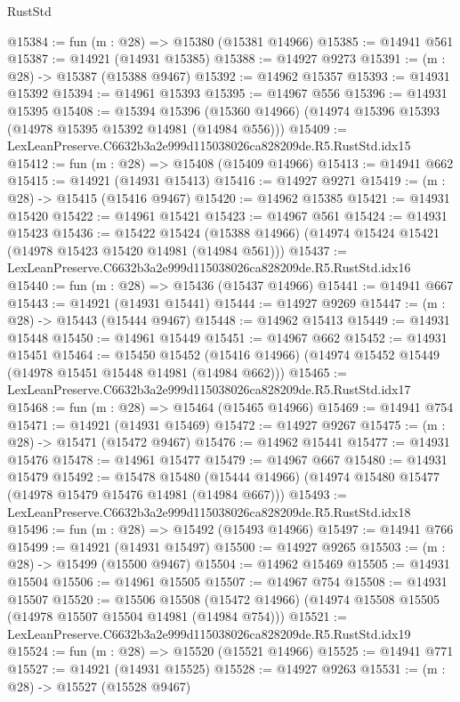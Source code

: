 \begin{lexlean}{RustStd}
\begin{coremodule}
@15384 := fun (m : @28) => @15380 (@15381 @14966)
@15385 := @14941 @561
@15387 := @14921 (@14931 @15385)
@15388 := @14927 @9273
@15391 := (m : @28) -> @15387 (@15388 @9467)
@15392 := @14962 @15357
@15393 := @14931 @15392
@15394 := @14961 @15393
@15395 := @14967 @556
@15396 := @14931 @15395
@15408 := @15394
    @15396
    (@15360 @14966)
    (@14974 @15396 @15393 (@14978 @15395 @15392 @14981 (@14984 @556)))
@15409 := LexLeanPreserve.C6632b3a2e999d115038026ca828209de.R5.RustStd.idx15
@15412 := fun (m : @28) => @15408 (@15409 @14966)
@15413 := @14941 @662
@15415 := @14921 (@14931 @15413)
@15416 := @14927 @9271
@15419 := (m : @28) -> @15415 (@15416 @9467)
@15420 := @14962 @15385
@15421 := @14931 @15420
@15422 := @14961 @15421
@15423 := @14967 @561
@15424 := @14931 @15423
@15436 := @15422
    @15424
    (@15388 @14966)
    (@14974 @15424 @15421 (@14978 @15423 @15420 @14981 (@14984 @561)))
@15437 := LexLeanPreserve.C6632b3a2e999d115038026ca828209de.R5.RustStd.idx16
@15440 := fun (m : @28) => @15436 (@15437 @14966)
@15441 := @14941 @667
@15443 := @14921 (@14931 @15441)
@15444 := @14927 @9269
@15447 := (m : @28) -> @15443 (@15444 @9467)
@15448 := @14962 @15413
@15449 := @14931 @15448
@15450 := @14961 @15449
@15451 := @14967 @662
@15452 := @14931 @15451
@15464 := @15450
    @15452
    (@15416 @14966)
    (@14974 @15452 @15449 (@14978 @15451 @15448 @14981 (@14984 @662)))
@15465 := LexLeanPreserve.C6632b3a2e999d115038026ca828209de.R5.RustStd.idx17
@15468 := fun (m : @28) => @15464 (@15465 @14966)
@15469 := @14941 @754
@15471 := @14921 (@14931 @15469)
@15472 := @14927 @9267
@15475 := (m : @28) -> @15471 (@15472 @9467)
@15476 := @14962 @15441
@15477 := @14931 @15476
@15478 := @14961 @15477
@15479 := @14967 @667
@15480 := @14931 @15479
@15492 := @15478
    @15480
    (@15444 @14966)
    (@14974 @15480 @15477 (@14978 @15479 @15476 @14981 (@14984 @667)))
@15493 := LexLeanPreserve.C6632b3a2e999d115038026ca828209de.R5.RustStd.idx18
@15496 := fun (m : @28) => @15492 (@15493 @14966)
@15497 := @14941 @766
@15499 := @14921 (@14931 @15497)
@15500 := @14927 @9265
@15503 := (m : @28) -> @15499 (@15500 @9467)
@15504 := @14962 @15469
@15505 := @14931 @15504
@15506 := @14961 @15505
@15507 := @14967 @754
@15508 := @14931 @15507
@15520 := @15506
    @15508
    (@15472 @14966)
    (@14974 @15508 @15505 (@14978 @15507 @15504 @14981 (@14984 @754)))
@15521 := LexLeanPreserve.C6632b3a2e999d115038026ca828209de.R5.RustStd.idx19
@15524 := fun (m : @28) => @15520 (@15521 @14966)
@15525 := @14941 @771
@15527 := @14921 (@14931 @15525)
@15528 := @14927 @9263
@15531 := (m : @28) -> @15527 (@15528 @9467)

\end{coremodule}
\end{lexlean}
